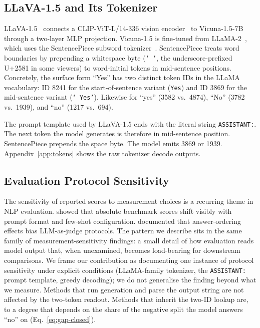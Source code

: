 \documentclass[11pt,letterpaper]{article}
\begin{document}
\subsection{LLaVA-1.5 and Its Tokenizer}

LLaVA-1.5~\citep{liu2023improved} connects a CLIP-ViT-L/14-336 vision
encoder~\citep{radford2021learning} to Vicuna-1.5-7B through a two-layer
MLP projection. Vicuna-1.5 is fine-tuned from LLaMA-2~\citep{touvron2023llama2},
which uses the SentencePiece subword tokenizer~\citep{kudo2018sentencepiece}.
SentencePiece treats word boundaries by prepending a whitespace byte
(\texttt{`\,'}, the underscore-prefixed U+2581 in some viewers) to
word-initial tokens in mid-sentence positions. Concretely, the surface
form ``Yes'' has two distinct token IDs in the LLaMA vocabulary: ID 8241
for the start-of-sentence variant (\texttt{Yes}) and ID 3869 for the
mid-sentence variant (\texttt{`\,Yes'}). Likewise for ``yes'' (3582 vs.\
4874), ``No'' (3782 vs.\ 1939), and ``no'' (1217 vs.\ 694).

The prompt template used by LLaVA-1.5 ends with the literal string
\texttt{ASSISTANT:}. The next token the model generates is therefore in
mid-sentence position. SentencePiece prepends the space byte. The model
emits 3869 or 1939. Appendix~\ref{app:tokens} shows the raw tokenizer
decode outputs.

\subsection{Evaluation Protocol Sensitivity}

The sensitivity of reported scores to measurement choices is a
recurring theme in NLP evaluation. \citet{liang2022holistic} showed
that absolute benchmark scores shift visibly with prompt format and
few-shot configuration. \citet{zheng2023judging} documented that
answer-ordering effects bias LLM-as-judge protocols. The pattern we
describe sits in the same family of measurement-sensitivity findings:
a small detail of how evaluation reads model output that, when
unexamined, becomes load-bearing for downstream comparisons. We frame
our contribution as documenting one instance of protocol sensitivity
under explicit conditions (LLaMA-family tokenizer, the
\texttt{ASSISTANT:} prompt template, greedy decoding); we do not
generalise the finding beyond what we measure. Methods that run
generation and parse the output string are not affected by the
two-token readout. Methods that inherit the two-ID lookup are, to a
degree that depends on the share of the negative split the model
answers ``no'' on (Eq.~\ref{eq:gap-closed}).
\end{document}
